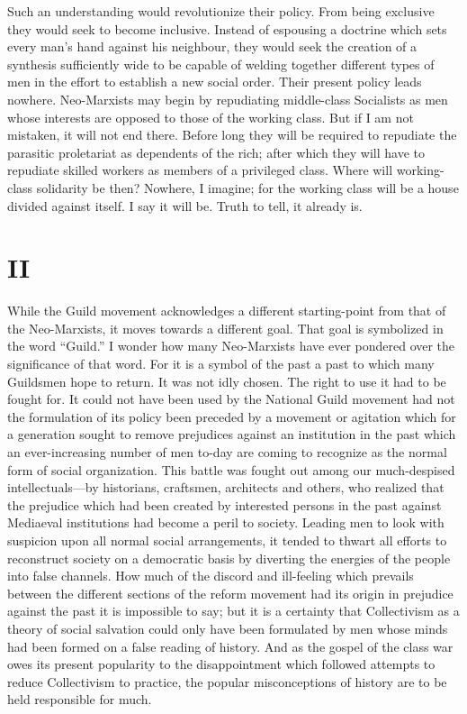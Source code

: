 \documentclass{book}
\begin{document}
Such an understanding would revolutionize their policy. From being exclusive they would seek to become inclusive. Instead of espousing a doctrine which sets every man’s hand against his neighbour, they would seek the creation of a synthesis sufficiently wide to be capable of welding together different types of men in the effort to establish a new social order. Their present policy leads nowhere. Neo-Marxists may begin by repudiating middle-class Socialists as men whose interests are opposed to those of the working class. But if I am not mistaken, it will not end there. Before long they will be required to repudiate the parasitic proletariat as dependents of the rich; after which they will have to repudiate skilled workers as members of a privileged class. Where will working-class solidarity be then? Nowhere, I imagine; for the working class will be a house divided against itself. I say it will be. Truth to tell, it already is.

\section{II}
While the Guild movement acknowledges a different starting-point from that of the Neo-Marxists, it moves towards a different goal. That goal is symbolized in the word “Guild.” I wonder how many Neo-Marxists have ever pondered over the significance of that word. For it is a symbol of the past a past to which many Guildsmen hope to return. It was not idly chosen. The right to use it had to be fought for. It could not have been used by the National Guild movement had not the formulation of its policy been preceded by a movement or agitation which for a generation sought to remove prejudices against an institution in the past which an ever-increasing number of men to-day are coming to recognize as the normal form of social organization. This battle was fought out among our much-despised intellectuals—by historians, craftsmen, architects and others, who realized that the prejudice which had been created by interested persons in the past against Mediaeval institutions had become a peril to society. Leading men to look with suspicion upon all normal social arrangements, it tended to thwart all efforts to reconstruct society on a democratic basis by diverting the energies of the people into false channels. How much of the discord and ill-feeling which prevails between the different sections of the reform movement had its origin in prejudice against the past it is impossible to say; but it is a certainty that Collectivism as a theory of social salvation could only have been formulated by men whose minds had been formed on a false reading of history. And as the gospel of the class war owes its present popularity to the disappointment which followed attempts to reduce Collectivism to practice, the popular misconceptions of history are to be held responsible for much.
\end{document}
